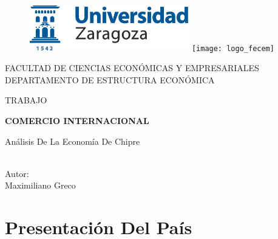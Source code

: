 \documentclass[a4paper,openright,12pt]{book}
\begin{document}
\begin{titlepage}

\begin{center}
\vspace*{-1in}
\begin{figure}[htb]
\begin{center}
\includegraphics[height=2cm]{logo_uz}
\hfill
\texttt{[image: logo\_fecem]}
\end{center}
\end{figure}
\vspace*{0.15in}
FACULTAD DE CIENCIAS ECONÓMICAS Y EMPRESARIALES \\
\vspace*{0.15in}
DEPARTAMENTO DE ESTRUCTURA ECONÓMICA\\
\vspace*{0.6in}
\begin{large}
TRABAJO\\
\end{large}
\vspace*{0.2in}
\begin{Large}
\textbf{COMERCIO INTERNACIONAL} \\
\end{Large}
\vspace*{0.3in}
\begin{large}
Análisis De La Economía De Chipre \\ 
\end{large}
\vspace*{0.3in}
\begin{large}
Autor: \\
Maximiliano Greco \\
\end{large}
\end{center}

\end{titlepage}

\newpage





\chapter{Presentación Del País}
\label{cap1}
\end{document}
